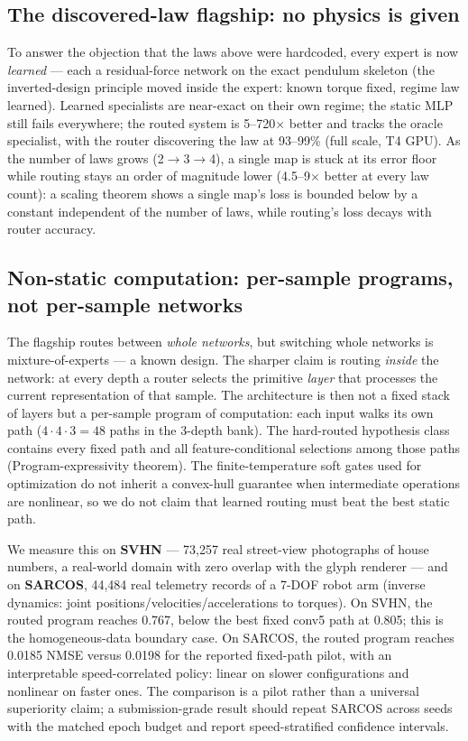 \documentclass[conference,10pt]{IEEEtran}
\begin{document}
\subsection{The discovered-law flagship: no physics is given}\label{sec:discovered}
To answer the objection that the laws above were hardcoded, every expert is now \emph{learned} --- each a residual-force network on the exact pendulum skeleton (the inverted-design principle moved inside the expert: known torque fixed, regime law learned). Learned specialists are near-exact on their own regime; the static MLP still fails everywhere; the routed system is 5--720$\times$ better and tracks the oracle specialist, with the router discovering the law at 93--99\% (full scale, T4 GPU). As the number of laws grows (2$\rightarrow$3$\rightarrow$4), a single map is stuck at its error floor while routing stays an order of magnitude lower (4.5--9$\times$ better at every law count): a scaling theorem shows a single map's loss is bounded below by a constant independent of the number of laws, while routing's loss decays with router accuracy.

\subsection{Non-static computation: per-sample programs, not per-sample networks}\label{sec:nonstatic}
The flagship routes between \emph{whole networks}, but switching whole networks is mixture-of-experts --- a known design. The sharper claim is routing \emph{inside} the network: at every depth a router selects the primitive \emph{layer} that processes the current representation of that sample. The architecture is then not a fixed stack of layers but a per-sample program of computation: each input walks its own path ($4\cdot4\cdot3=48$ paths in the 3-depth bank). The hard-routed hypothesis class contains every fixed path and all feature-conditional selections among those paths (Program-expressivity theorem). The finite-temperature soft gates used for optimization do not inherit a convex-hull guarantee when intermediate operations are nonlinear, so we do not claim that learned routing must beat the best static path.

We measure this on \textbf{SVHN} --- 73{,}257 real street-view photographs of house numbers, a real-world domain with zero overlap with the glyph renderer --- and on \textbf{SARCOS}, 44{,}484 real telemetry records of a 7-DOF robot arm (inverse dynamics: joint positions/velocities/accelerations to torques). On SVHN, the routed program reaches 0.767, below the best fixed conv5 path at 0.805; this is the homogeneous-data boundary case. On SARCOS, the routed program reaches 0.0185 NMSE versus 0.0198 for the reported fixed-path pilot, with an interpretable speed-correlated policy: linear on slower configurations and nonlinear on faster ones. The comparison is a pilot rather than a universal superiority claim; a submission-grade result should repeat SARCOS across seeds with the matched epoch budget and report speed-stratified confidence intervals.
\end{document}
